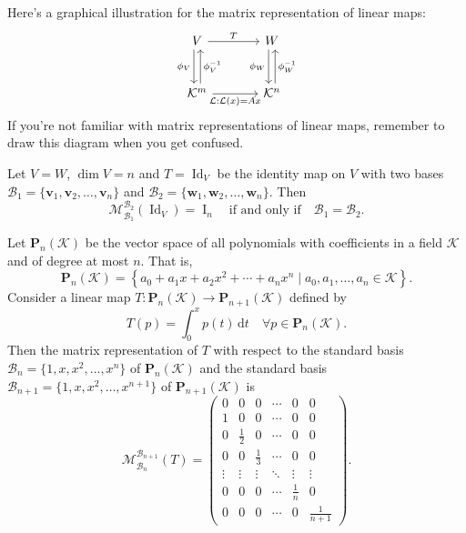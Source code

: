 \documentclass{ctexart}
\begin{document}
	\begin{myrmk}
		Here's a graphical illustration for the matrix representation of linear maps:
		\[
		\begin{tikzcd}[row sep=large, column sep=large]
		V
		\arrow[r, "T"]
		\arrow[d, xshift=-0.6ex, "\phi_V"']
		& W
		\arrow[d, xshift=-0.6ex, "\phi_W"'] \\
		\mathcal{K}^m
		\arrow[r, "\mathcal{L}: \mathcal{L}(x)=A x"']
		\arrow[u, xshift=0.6ex, "\phi_V^{-1}" ']
		& \mathcal{K}^n
		\arrow[u, xshift=0.6ex, "\phi_W^{-1}"']
		\end{tikzcd}
		\]
		If you're not familiar with matrix representations of linear maps, remember to draw this diagram when you get confused.
	\end{myrmk}
	\begin{mypro}
		Let $V=W$, $\dim V = n$ and $T = \operatorname{Id}_V$ be the identity map on $V$ with two bases $\mathcal{B}_1=\{\mathbf{v}_1, \mathbf{v}_2, \dots, \mathbf{v}_n\}$ and $\mathcal{B}_2=\{ \mathbf{w}_1, \mathbf{w}_2, \dots, \mathbf{w}_n\}$. Then
		\[
		\mathcal{M}^{\mathcal{B}_2}_{\mathcal{B}_1}(\operatorname{Id}_V) = \operatorname{I}_n\quad \text{if and only if} \quad \mathcal{B}_1 = \mathcal{B}_2.
		\]
		
	\end{mypro}
	\begin{myex}
		Let $\mathbf{P}_n(\mathcal{K})$ be the vector space of all polynomials with coefficients in a field $\mathcal{K}$ and of degree at most $n$. That is,
		\[
		\mathbf{P}_n(\mathcal{K}) = \left\{ a_0 + a_1 x + a_2 x^2 + \cdots + a_n x^n \mid a_0, a_1, \dots, a_n \in \mathcal{K} \right\}.
		\]
		Consider a linear map $T: \mathbf{P}_n(\mathcal{K}) \to \mathbf{P}_{n+1}(\mathcal{K})$ defined by
		\[
		T(p)=\int_0 ^x p(t) \,\mathrm{d}t\quad \forall p \in \mathbf{P}_n(\mathcal{K}).
		\]
		Then the matrix representation of $T$ with respect to the standard basis $\mathcal{B}_{n} = \{1, x, x^2, \dots, x^n\}$ of $\mathbf{P}_n(\mathcal{K})$ and the standard basis $\mathcal{B}_{n+1} = \{1, x, x^2, \dots, x^{n+1}\}$ of $\mathbf{P}_{n+1}(\mathcal{K})$ is
		\[\mathcal{M}^{\mathcal{B}_{n+1}}_{\mathcal{B}_n}(T) =
		\begin{pmatrix}
			0 & 0 & 0 & \cdots & 0 & 0 \\
			1 & 0 & 0 & \cdots & 0 & 0 \\
			0 & \frac{1}{2} & 0 & \cdots & 0 & 0 \\
			0 & 0 & \frac{1}{3} & \cdots & 0 & 0 \\
			\vdots & \vdots & \vdots & \ddots & \vdots & \vdots \\
			0 & 0 & 0 & \cdots & \frac{1}{n} & 0 \\
			0 & 0 & 0 & \cdots & 0 & \frac{1}{n+1}
		\end{pmatrix}.
		\]
	\end{myex}
\end{document}
